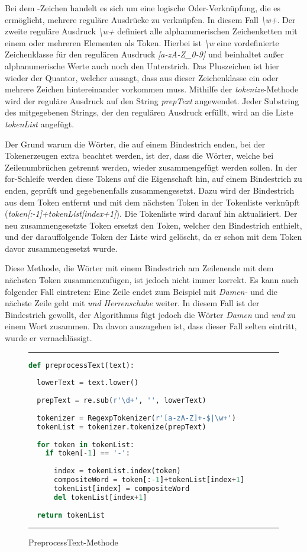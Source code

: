 Bei dem \textbar{}-Zeichen handelt es sich um eine logische Oder-Verknüpfung, die es ermöglicht, mehrere reguläre Ausdrücke zu verknüpfen. In diesem Fall \textit{\textbackslash w+}. Der zweite reguläre Ausdruck \textit{\textbackslash w+} definiert alle alphanumerischen Zeichenketten mit einem oder mehreren Elementen als Token. Hierbei ist \textit{\textbackslash w} eine vordefinierte Zeichenklasse für den regulären Ausdruck \textit{[a-zA-Z\_0-9]} und beinhaltet außer alphanumerische Werte auch noch den Unterstrich. Das Pluszeichen ist hier wieder der Quantor, welcher aussagt, dass aus dieser Zeichenklasse ein oder mehrere Zeichen hintereinander vorkommen muss. Mithilfe der \textit{tokenize}-Methode wird der reguläre Ausdruck auf den String \textit{prepText} angewendet. Jeder Substring des mitgegebenen Strings, der den regulären Ausdruck erfüllt, wird an die Liste \textit{tokenList} angefügt.

Der Grund warum die Wörter, die auf einem Bindestrich enden, bei der Tokenerzeugen extra beachtet werden, ist der, dass die Wörter, welche bei Zeilenumbrüchen getrennt werden, wieder zusammengefügt werden sollen. In der for-Schleife werden diese Tokens auf die Eigenschaft hin, auf einem Bindestrich zu enden, geprüft und gegebenenfalls zusammengesetzt. Dazu wird der Bindestrich aus dem Token entfernt und mit dem nächsten Token in der Tokenliste verknüpft (\textit{token[:-1]+tokenList[index+1]}). Die Tokenliste wird darauf hin aktualisiert. Der neu zusammengesetzte Token ersetzt den Token, welcher den Bindestrich enthielt, und der darauffolgende Token der Liste wird gelöscht, da er schon mit dem Token davor zusammengesetzt wurde.

Diese Methode, die Wörter mit einem Bindestrich am Zeilenende mit dem nächsten Token zusammenzufügen, ist jedoch nicht immer korrekt. Es kann auch folgender Fall eintreten: Eine Zeile endet zum Beispiel mit \textit{Damen-} und die nächste Zeile geht mit \textit{und Herrenschuhe} weiter. In diesem Fall ist der Bindestrich gewollt, der Algorithmus fügt jedoch die Wörter \textit{Damen} und \textit{und} zu einem Wort zusammen. Da davon auszugehen ist, dass dieser Fall selten eintritt, wurde er vernachlässigt.

\begin{figure}
	\rule{\textwidth}{0.4pt}
		\begin{lstlisting}[language=Python]
def preprocessText(text):
    
  lowerText = text.lower()
    
  prepText = re.sub(r'\d+', '', lowerText)
            
  tokenizer = RegexpTokenizer(r'[a-zA-Z]+-$|\w+')
  tokenList = tokenizer.tokenize(prepText)
    
  for token in tokenList:
    if token[-1] == '-':
            
      index = tokenList.index(token)
      compositeWord = token[:-1]+tokenList[index+1]
      tokenList[index] = compositeWord
      del tokenList[index+1]
            
  return tokenList
		\end{lstlisting}
	\rule{\textwidth}{0.4pt}
	\caption{PreprocessText-Methode}
	\label{fig:preprocess}
\end{figure}

